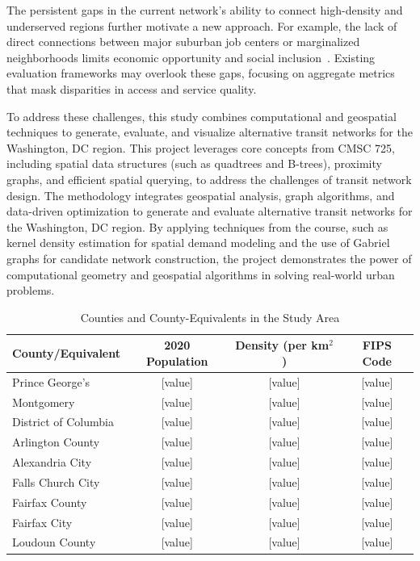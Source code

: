 \documentclass[manuscript,nonacm]{acmart}
\begin{document}
The persistent gaps in the current network's ability to connect high-density and underserved regions further motivate a new approach. For example, the lack of direct connections between major suburban job centers or marginalized neighborhoods limits economic opportunity and social inclusion~\cite{lit:equity}. Existing evaluation frameworks may overlook these gaps, focusing on aggregate metrics that mask disparities in access and service quality. 

To address these challenges, this study combines computational and geospatial techniques to generate, evaluate, and visualize alternative transit networks for the Washington, DC region. This project leverages core concepts from CMSC 725, including spatial data structures (such as quadtrees and B-trees), proximity graphs, and efficient spatial querying, to address the challenges of transit network design. The methodology integrates geospatial analysis, graph algorithms, and data-driven optimization to generate and evaluate alternative transit networks for the Washington, DC region. By applying techniques from the course, such as kernel density estimation for spatial demand modeling and the use of Gabriel graphs for candidate network construction, the project demonstrates the power of computational geometry and geospatial algorithms in solving real-world urban problems.



\begin{table}[h]
\caption{Counties and County-Equivalents in the Study Area}
\label{tab:counties}
\begin{tabular}{lccc}
\toprule
County/Equivalent & 2020 Population & Density (per km$^2$) & FIPS Code \\
\midrule
Prince George's & [value] & [value] & [value] \\
Montgomery & [value] & [value] & [value] \\
District of Columbia & [value] & [value] & [value] \\
Arlington County & [value] & [value] & [value] \\
Alexandria City & [value] & [value] & [value] \\
Falls Church City & [value] & [value] & [value] \\
Fairfax County & [value] & [value] & [value] \\
Fairfax City & [value] & [value] & [value] \\
Loudoun County & [value] & [value] & [value] \\
\bottomrule
\end{tabular}
\end{table}
\end{document}
